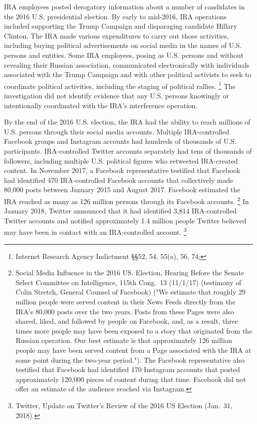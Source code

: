 IRA employees posted derogatory information about a  number of candidates in the 2016 U.S. presidential election.
By early to mid-2016, IRA operations included supporting the Trump Campaign and disparaging candidate Hillary Clinton.
The IRA made various expenditures to carry out those activities, including buying political advertisements on social media in the names of U.S. persons and entities.
Some IRA employees, posing as U.S. persons and without revealing their Russian association, communicated electronically with individuals associated with the Trump Campaign and with other political activists to seek to coordinate political activities, including the staging of political rallies.%
\footnote{Internet Research Agency Indictment \S\S 52, 54, 55(a), 56, 74; }
The investigation did not identify evidence that any U.S. persons knowingly or intentionally coordinated with the IRA's interference operation.

By the end of the 2016 U.S. election, the IRA had the ability to reach millions of U.S. persons through their social media accounts.
Multiple IRA-controlled Facebook groups and Instagram accounts had hundreds of thousands of U.S. participants.
IRA-controlled Twitter accounts separately had tens of thousands of followers, including multiple U.S. political figures who retweeted IRA-created content.
In November 2017, a Facebook representative testified that Facebook had identified 470 IRA-controlled Facebook accounts that collectively made 80,000 posts between January 2015 and August 2017.
Facebook estimated the IRA reached as many as 126 million persons through its Facebook accounts.%
\footnote{Social Media Influence in the 2016 US. Election, Hearing Before the Senate Select Committee on Intelligence, 115th Cong.~13 (11/1/17) (testimony of Colin Stretch, General Counsel of Facebook)
("We estimate that roughly 29 million people were served content in their News Feeds directly from the IRA's 80,000 posts over the two years.
Posts from these Pages were also shared, liked, and followed by people on Facebook, and, as a result, three times more people may have been exposed to a story that originated from the Russian operation.
Our best estimate is that approximately 126 million people may have been served content from a Page associated with the IRA at some point during the two-year period.").
The Facebook representative also testified that Facebook had identified 170 Instagram accounts that posted approximately 120,000 pieces of content during that time.
Facebook did not offer an estimate of the audience reached via Instagram.}
In January 2018, Twitter announced that it had identified 3,814 IRA-controlled Twitter accounts and notified approximately 1.4 million people Twitter believed may have been in contact with an IRA-controlled account.%
\footnote{Twitter, Update on Twitter's Review of the 2016 US Election (Jan.~31, 2018).}

